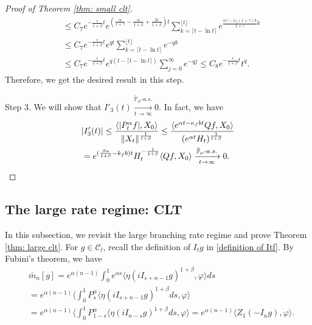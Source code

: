 \documentclass[12pt,a4paper]{amsart}
\theoremstyle{plain}
\theoremstyle{definition}
\numberwithin{equation}{section}
\begin{document}
\begin{proof}[Proof of Theorem \ref{thm: small clt}]
\begin{align}
    &\leq C_7 e^{-\frac{\epsilon}{1+\beta} t}e^{(\frac{\alpha }{1+\gamma}-\frac{\alpha }{1+\beta} + \frac{2\epsilon}{1+\beta})t} \sum_{k=\lceil t-\ln t \rceil}^{\lfloor t \rfloor}e^{\frac{\alpha\gamma-\kappa_f(1+\gamma)b}{1+\gamma}k}\\
    &\leq C_7 e^{-\frac{\epsilon}{1+\beta} t} e^{qt} \sum_{k=\lceil t-\ln t \rceil}^{\lfloor t \rfloor}e^{-qk}\\
    &\leq C_7 e^{-\frac{\epsilon}{1+\beta} t} e^{q(t - \lceil t - \ln t\rceil)} \sum_{j=0}^{\infty}e^{-qj}\leq C_8 e^{-\frac{\epsilon}{1+\beta} t} t^q.
\end{align}
	Therefore, we get the desired result in this step.

	Step 3. We will show that $I'_3(t) \xrightarrow[t\to \infty]{\tilde {\mathbb P}_\mu \text{-} a.s.} 0$.
    In fact, we have
\begin{align}
	&|I'_3(t)|
     \leq \frac{\langle |P^\alpha_tf|,X_0\rangle}{\|X_t\|^{\frac{1}{1+\beta}}}
	\leq \frac{\langle e^{\alpha t - \kappa_f b t}Qf,X_0\rangle}{(e^{\alpha t} H_t)^{\frac{1}{1+\beta}}}
	\\& = e^{(\frac{\beta \alpha }{1+\beta} - k_fb)t} H_t^{-\frac{1}{1+\beta}} \langle Qf,X_0\rangle
	\xrightarrow[t\to \infty]{\tilde {\mathbb P}_\mu \text{-} a.s.} 0.
    \qedhere
\end{align}
\end{proof}
\subsection{The large rate regime: CLT}
\label{sec: large rate clt}
    In this subsection, we revisit the large branching rate regime and prove Theorem \ref{thm: large clt}.
    For $g\in \mathcal{C}_l$, recall the definition of $I_tg$ in \eqref{definition of Itf}.
    By Fubini's theorem, we have
\begin{align}\label{equ: transform of mn}
    &\bar{m}_n[g]=e^{\alpha(n-1)}\int_0^1 e^{\alpha s}\langle \eta(iI_{s+n-1}g)^{1+\beta}, \varphi\rangle ds\\
    &=e^{\alpha(n-1)}\langle \int_0^1 P_s^{\alpha}\langle \eta(iI_{s+n-1}g)^{1+\beta}ds, \varphi\rangle\\
    &=e^{\alpha(n-1)}\langle \int_0^1 P_{1-s}^{\alpha}\langle \eta(iI_{n-s}g)^{1+\beta}ds, \varphi\rangle=e^{\alpha(n-1)}\langle Z_1(-I_ng), \varphi\rangle.
\end{align}
\end{document}
